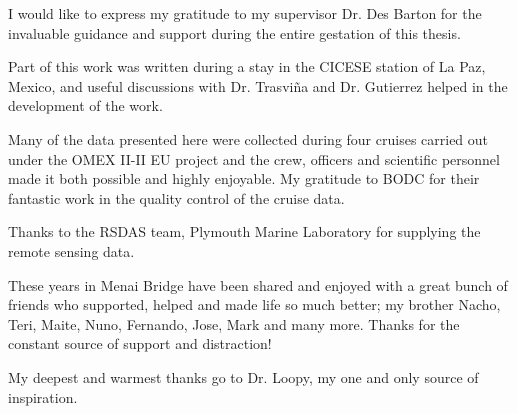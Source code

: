 \documentclass[sos,noblankpages,12pt,twoside]{mythesis}
\begin{document}
\begin{acknowledgments}
I would like to express my gratitude to my supervisor Dr. Des
Barton for the invaluable guidance and support during the entire
gestation of this thesis.

Part of this work was written during a stay in the CICESE station
of La Paz, Mexico, and useful discussions with Dr. Trasvi\~na and
Dr. Gutierrez helped in the development of the work.

Many of the data presented here were collected during four cruises
carried out under the OMEX II-II EU project and the crew, officers
and scientific personnel made it both possible and highly
enjoyable. My gratitude to BODC for their fantastic work in the
quality control of the cruise data.

Thanks to the RSDAS team, Plymouth Marine Laboratory for supplying
the remote sensing data.

These years in Menai Bridge have been shared and enjoyed with a
great bunch of friends who supported, helped and made life so much
better; my brother Nacho, Teri, Maite, Nuno, Fernando, Jose, Mark
and many more. Thanks for the constant source of support and
distraction!

My deepest and warmest thanks go to Dr. Loopy, my one and only
source of inspiration.
\end{acknowledgments}
 \tableofcontents

\setlength{\parindent}{0pt}                     %
\setlength{\parskip}{0.5cm}%
\setlength{\textheight}{9.25truein}             %



\graphicspath{{d:/PhD/literature/graphics/}}

%
\graphicspath{{d:/papers/qscatwind/graphics/}}


\graphicspath{{d:/PhD/chapter2/graphics/}}


\graphicspath{{d:/PhD/chapter3/graphics/}}

%
\graphicspath{{d:/PhD/chapter4/graphics/}}

%
\graphicspath{{d:/PhD/chapter5/graphics/}}


\graphicspath{{d:/PhD/chapter6/graphics/}}





\setlength{\parindent}{0pt}                     %
\setlength{\parskip}{1ex plus 0.5ex minus 0.7ex}%
\setlength{\textheight}{9.25truein}             %
\listoffigures
%
\end{document}
